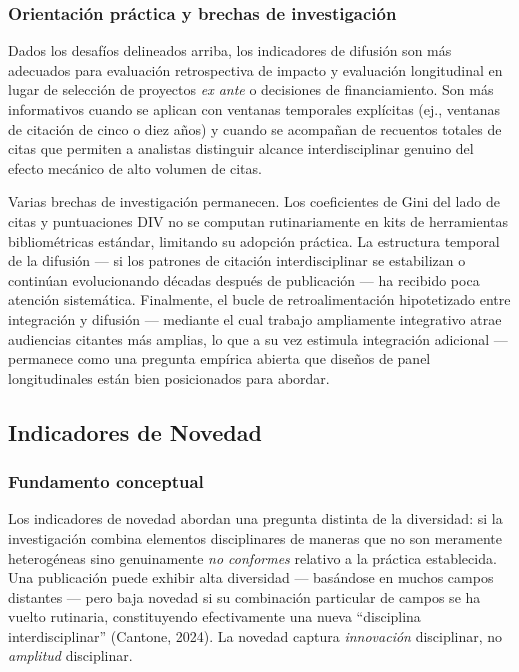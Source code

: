 \documentclass[
]{article}
\begin{document}
\hypertarget{orientaciuxf3n-pruxe1ctica-y-brechas-de-investigaciuxf3n}{%
\subsubsection{Orientación práctica y brechas de
investigación}\label{orientaciuxf3n-pruxe1ctica-y-brechas-de-investigaciuxf3n}}

Dados los desafíos delineados arriba, los indicadores de difusión son
más adecuados para evaluación retrospectiva de impacto y evaluación
longitudinal en lugar de selección de proyectos \emph{ex ante} o
decisiones de financiamiento. Son más informativos cuando se aplican con
ventanas temporales explícitas (ej., ventanas de citación de cinco o
diez años) y cuando se acompañan de recuentos totales de citas que
permiten a analistas distinguir alcance interdisciplinar genuino del
efecto mecánico de alto volumen de citas.

Varias brechas de investigación permanecen. Los coeficientes de Gini del
lado de citas y puntuaciones DIV no se computan rutinariamente en kits
de herramientas bibliométricas estándar, limitando su adopción práctica.
La estructura temporal de la difusión --- si los patrones de citación
interdisciplinar se estabilizan o continúan evolucionando décadas
después de publicación --- ha recibido poca atención sistemática.
Finalmente, el bucle de retroalimentación hipotetizado entre integración
y difusión --- mediante el cual trabajo ampliamente integrativo atrae
audiencias citantes más amplias, lo que a su vez estimula integración
adicional --- permanece como una pregunta empírica abierta que diseños
de panel longitudinales están bien posicionados para abordar.

\hypertarget{indicadores-de-novedad}{%
\subsection{Indicadores de Novedad}\label{indicadores-de-novedad}}

\hypertarget{fundamento-conceptual}{%
\subsubsection{Fundamento conceptual}\label{fundamento-conceptual}}

Los indicadores de novedad abordan una pregunta distinta de la
diversidad: si la investigación combina elementos disciplinares de
maneras que no son meramente heterogéneas sino genuinamente \emph{no
conformes} relativo a la práctica establecida. Una publicación puede
exhibir alta diversidad --- basándose en muchos campos distantes ---
pero baja novedad si su combinación particular de campos se ha vuelto
rutinaria, constituyendo efectivamente una nueva ``disciplina
interdisciplinar'' (Cantone, 2024). La novedad captura \emph{innovación}
disciplinar, no \emph{amplitud} disciplinar.
\end{document}
